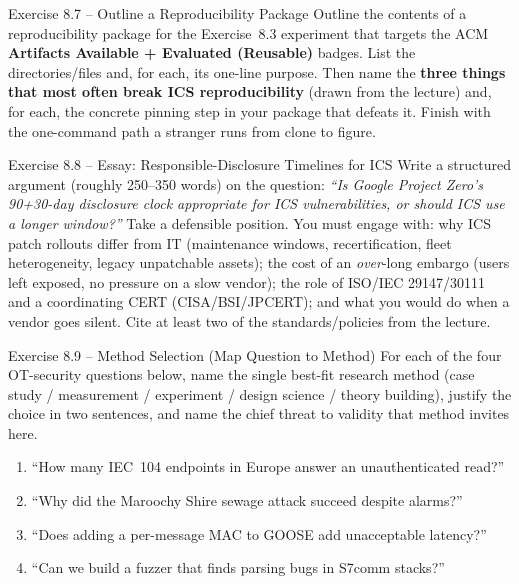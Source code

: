\documentclass[11pt,a4paper]{article}
\begin{document}
\begin{taskbox}{Exercise 8.7 -- Outline a Reproducibility Package}
Outline the contents of a reproducibility package for the Exercise~8.3 experiment
that targets the ACM \textbf{Artifacts Available + Evaluated (Reusable)} badges.
List the directories/files and, for each, its one-line purpose. Then name the
\textbf{three things that most often break ICS reproducibility} (drawn from the
lecture) and, for each, the concrete pinning step in your package that defeats it.
Finish with the one-command path a stranger runs from clone to figure.
\end{taskbox}

\begin{taskbox}{Exercise 8.8 -- Essay: Responsible-Disclosure Timelines for ICS}
Write a structured argument (roughly 250--350 words) on the question: \emph{``Is
Google Project Zero's 90+30-day disclosure clock appropriate for ICS
vulnerabilities, or should ICS use a longer window?''} Take a defensible position.
You must engage with: why ICS patch rollouts differ from IT (maintenance windows,
recertification, fleet heterogeneity, legacy unpatchable assets); the cost of an
\emph{over}-long embargo (users left exposed, no pressure on a slow vendor); the
role of ISO/IEC 29147/30111 and a coordinating CERT (CISA/BSI/JPCERT); and what
you would do when a vendor goes silent. Cite at least two of the standards/policies
from the lecture.
\end{taskbox}

\begin{taskbox}{Exercise 8.9 -- Method Selection (Map Question to Method)}
For each of the four OT-security questions below, name the single best-fit research
method (case study / measurement / experiment / design science / theory building),
justify the choice in two sentences, and name the chief threat to validity that
method invites here.
\begin{enumerate}\setlength{\itemsep}{1pt}
  \item ``How many IEC~104 endpoints in Europe answer an unauthenticated read?''
  \item ``Why did the Maroochy Shire sewage attack succeed despite alarms?''
  \item ``Does adding a per-message MAC to GOOSE add unacceptable latency?''
  \item ``Can we build a fuzzer that finds parsing bugs in S7comm stacks?''
\end{enumerate}
\end{taskbox}
\end{document}
